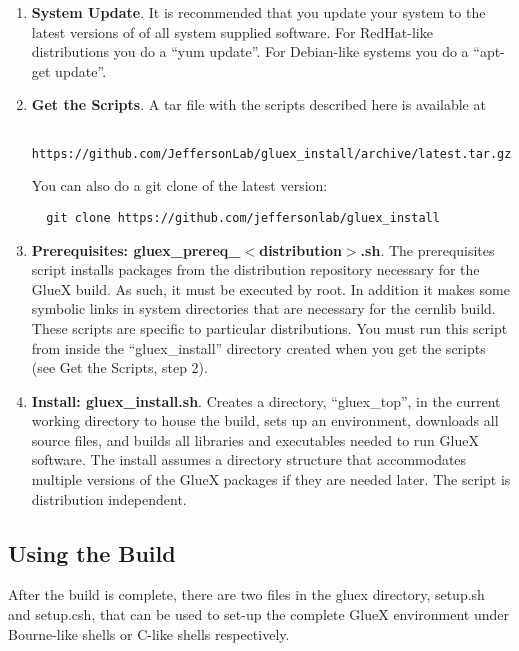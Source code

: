 \documentclass[12pt]{article}
\begin{document}
\begin{enumerate}

\item {\bf System Update}. It is recommended that you update your
  system to the latest versions of of all system supplied
  software. For RedHat-like distributions you do a ``yum update''. For
  Debian-like systems you do a ``apt-get update''.

\item {\bf Get the Scripts}. A tar file with the scripts described
  here is available at
\begin{verbatim}
  https://github.com/JeffersonLab/gluex_install/archive/latest.tar.gz
\end{verbatim}
You can also do a git clone of the latest version:
\begin{verbatim}
  git clone https://github.com/jeffersonlab/gluex_install
\end{verbatim}

\item {\bf Prerequisites: gluex\_prereq\_$<$distribution$>$.sh}. The
  prerequisites script installs packages from the distribution
  repository necessary for the GlueX build. As such, it must be
  executed by root. In addition it makes some symbolic links in system
  directories that are necessary for the cernlib build. These scripts
  are specific to particular distributions. You must run this
  script from inside the ``gluex\_install'' directory created when you
  get the scripts (see Get the Scripts, step 2).

\item {\bf Install: gluex\_install.sh}. Creates a directory,
  ``gluex\_top'', in the current working directory to house the build,
  sets up an environment, downloads all source files, and builds all
  libraries and executables needed to run GlueX software. The install
  assumes a directory structure that accommodates multiple versions of
  the GlueX packages if they are needed later. The script is
  distribution independent.

\end{enumerate}

\subsection{Using the Build}

After the build is complete, there are two files in the gluex
directory, setup.sh and setup.csh, that can be used to set-up the
complete GlueX environment under Bourne-like shells or C-like shells
respectively.
\end{document}
